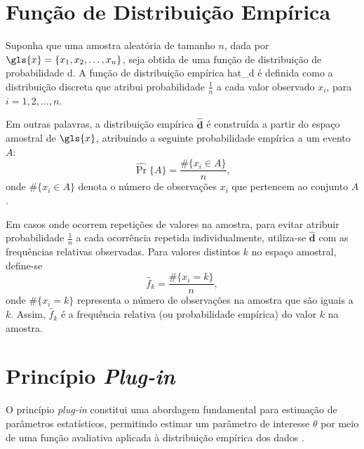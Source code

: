 \section{Função de Distribuição Empírica}
\label{sec:fundisemp}

Suponha que uma amostra aleatória de tamanho $n$, dada por $\gls{x} = \{x_1, x_2, \ldots, x_n\}$, seja obtida de uma função de distribuição de probabilidade \gls{d}. A função de distribuição empírica \gls{hat_d} é definida como a distribuição discreta que atribui probabilidade $\frac{1}{n}$ a cada valor observado $x_i$, para $i = 1, 2, \ldots, n$.

Em outras palavras, a distribuição empírica $\widehat{\mathbf{d}}$ é construída a partir do espaço amostral de $\gls{x}$, atribuindo a seguinte probabilidade empírica a um evento $A$:
\begin{equation}
    \widehat{\Pr}\{A\} = \frac{\#\{x_i \in A\}}{n},
\end{equation}
onde $\#\{x_i \in A\}$ denota o número de observações $x_i$ que pertencem ao conjunto $A$.

Em casos onde ocorrem repetições de valores na amostra, para evitar atribuir probabilidade $\frac{1}{n}$ a cada ocorrência repetida individualmente, utiliza-se $\widehat{\mathbf{d}}$ com as frequências relativas observadas. Para valores distintos $k$ no espaço amostral, define-se
\begin{equation}
    \widehat{f}_k = \frac{\#\{x_i = k\}}{n},
\end{equation}
onde $\#\{x_i = k\}$ representa o número de observações na amostra que são iguais a $k$. Assim, $\widehat{f}_k$ é a frequência relativa (ou probabilidade empírica) do valor $k$ na amostra.
\section{Princípio \textit{Plug-in}}
\label{sec:priplu}

O princípio \textit{plug-in} constitui uma abordagem fundamental para estimação de parâmetros estatísticos, permitindo estimar um parâmetro de interesse $\theta$ por meio de uma função avaliativa aplicada à distribuição empírica dos dados \cite{EFRON:1997}.

